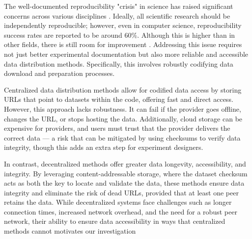 \documentclass[10pt,twocolumn,letterpaper]{article}
\begin{document}

The well-documented reproducibility "crisis" in science has raised significant concerns across various
  disciplines \cite{baker_reproducibility_2016}.
Ideally, all scientific research should be independently reproducible; however, even in computer science,
  reproducibility success rates are reported to be around 60\%.
Although this is higher than in other fields, there is still room for improvement
  \cite{NEURIPS2019_c429429b, collberg2016repeatability, desai_what_2024}.
Addressing this issue requires not just better experimental documentation but also more reliable and
  accessible data distribution methods.
Specifically, this involves robustly codifying data download and preparation processes.


Centralized data distribution methods allow for codified data access by storing URLs that point to datasets
  within the code, offering fast and direct access.
However, this approach lacks robustness.
It can fail if the provider goes offline, changes the URL, or stops hosting the data.
Additionally, cloud storage can be expensive for providers, and users must trust that the provider delivers
  the correct data --- a risk that can be mitigated by using checksums to verify data integrity, though this
  adds an extra step for experiment designers.

In contrast, decentralized methods offer greater data longevity, accessibility, and integrity.
By leveraging content-addressable storage, where the dataset checksum acts as both the key to locate and
  validate the data, these methods ensure data integrity and eliminate the risk of dead URLs, provided that at
  least one peer retains the data.
While decentralized systems face challenges such as longer connection times, increased network overhead, and
  the need for a robust peer network, their ability to ensure data accessibility in ways that centralized
  methods cannot motivates our investigation
\end{document}
